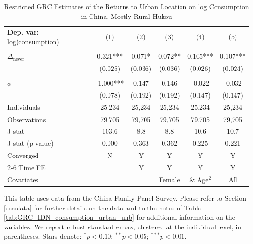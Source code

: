 \begin{table}[htbp] \centering \begin{threeparttable}
 \caption{Restricted GRC Estimates of the Returns to Urban Location on log Consumption in China, Mostly Rural Hukou} 
 \label{tab:GRC_CHN_most_rural_consumption_urban_unb} 
\begin{tabular}{l ccccc} \toprule  \textbf{Dep. var:}  log(consumption) 
                    &\multicolumn{1}{c}{(1)}   &\multicolumn{1}{c}{(2)}   &\multicolumn{1}{c}{(3)}   &\multicolumn{1}{c}{(4)}   &\multicolumn{1}{c}{(5)}   \\
                    &               &               &               &               &               \\
\addlinespace
$\Delta_{\text{never}}$&       0.321***&       0.071*  &       0.072** &       0.105***&       0.107***\\
                    &     (0.025)   &     (0.036)   &     (0.036)   &     (0.026)   &     (0.024)   \\
                    &               &               &               &               &               \\
\addlinespace
$\phi$              &      -1.000***&       0.147   &       0.146   &      -0.022   &      -0.032   \\
                    &     (0.078)   &     (0.192)   &     (0.192)   &     (0.147)   &     (0.147)   \\
\addlinespace
Individuals         &      25,234   &      25,234   &      25,234   &      25,234   &      25,234   \\
Observations        &      79,705   &      79,705   &      79,705   &      79,705   &      79,705   \\
J-stat              &       103.6   &         8.8   &         8.8   &        10.6   &        10.7   \\
J-stat (p-value)    &       0.000   &       0.363   &       0.362   &       0.225   &       0.221   \\
Converged           &           N   &           Y   &           Y   &           Y   &           Y   \\
\cmidrule{2-6} Time FE & & Y & Y & Y & Y \\ Covariates & & & Female & \& Age$^2$ & All \\ \bottomrule \end{tabular} \begin{tablenotes}[flushleft] \footnotesize \item{This table uses data from the China Family Panel Survey. Please refer to Section \ref{sec:data} for further details on the data and to the notes of Table \ref{tab:GRC_IDN_consumption_urban_unb} for additional information on the variables. We report robust standard errors, clustered at the individual level, in parentheses. Stars denote: $^{*} p<0.10$; $^{**} p<0.05$; $^{***} p<0.01$.} \end{tablenotes} \end{threeparttable} \end{table}

